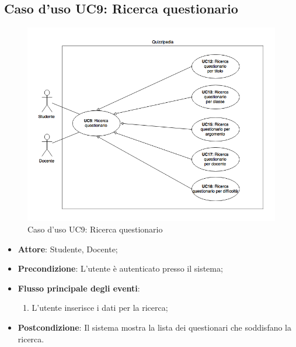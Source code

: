 \documentclass[12pt,a4paper]{article}
\begin{document}
\subsection{Caso d'uso UC9: Ricerca questionario}
\begin{figure}[H]
	\centering
	\includegraphics[width=\textwidth]{diagramUC9.png}
	\caption{Caso d'uso UC9: Ricerca questionario}\label{fig:UC9} 
\end{figure}
\begin{itemize}

\item \textbf{Attore}: Studente, Docente; 
\item \textbf{Precondizione}: L'utente è autenticato presso il sistema;

\item \textbf{Flusso principale degli eventi}:
\begin{enumerate}
	\item L'utente inserisce i dati per la ricerca;
	
\end{enumerate}
\item \textbf{Postcondizione}: Il sistema mostra la lista dei questionari che soddisfano la ricerca.
\end{itemize}
\hypertarget{UC10}{}
\end{document}
